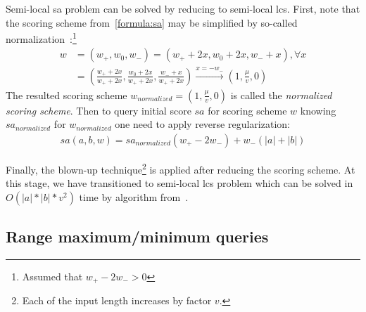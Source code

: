 Semi-local sa problem can be solved by reducing to semi-local lcs.
First, note that the scoring scheme from~\ref{formula:sa} may be simplified by so-called normalization~\cite{tiskin2008semi}:\footnote{ Assumed that $w_{+}-2w_{-}>0$}\begin{equation}\label{weightNormalization}
  \begin{array}{ll}
    w &= (w_{+}, w_{0} , w_{-}) = (w_{+} +2x , w_{0} + 2x , w_{-} + x), \forall x\\
    &= ( \frac{w_{+} +2x}{w_{+} +2x} , \frac {w_{0} + 2x}{w_{+} +2x} , \frac{w_{-} + x}{w_{+} +2x})
    \overset{x=-w_{-}}{\to} (1,\frac{\mu}{v} ,0) 
  \end{array}
\end{equation}
The resulted scoring scheme $w_{normalized} = (1,\frac{\mu}{v} ,0)$ is called the \emph{normalized scoring scheme}.
Then to query initial score $sa$ for scoring scheme $w$ knowing $sa_{normalized}$ for $w_{normalized}$ one need to apply reverse regularization:
\begin{equation}
  \begin{aligned}
    sa(a,b,w) = sa_{normalized}  (w_{+} - 2w_{-}) +  w_{-} (|a| + |b|)
  \end{aligned}
\end{equation}

Finally, the blown-up technique\footnote{Each of the input length increases by factor $v$.} is applied after reducing the scoring scheme.
At this stage, we have transitioned to semi-local lcs problem which can be solved in $O(|a| * |b| * v^2)$ time by algorithm from~\cite{tiskin2008semi}.



\subsection{Range maximum/minimum queries}

